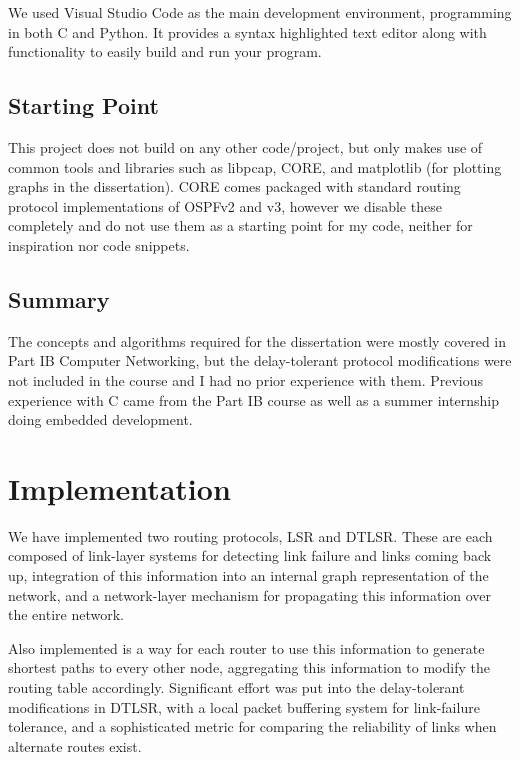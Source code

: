\documentclass[withindex,glossary,openany]{cam-thesis}
\begin{document}
We used Visual Studio Code as the main development environment, programming in both C and Python. It provides a syntax highlighted text editor along with functionality to easily build and run your program.


\section{Starting Point}

This project does not build on any other code/project, but only makes use of common tools and libraries such as libpcap, CORE, and matplotlib (for plotting graphs in the dissertation). CORE comes packaged with standard routing protocol implementations of OSPFv2 and v3, however we disable these completely and do not use them as a starting point for my code, neither for inspiration nor code snippets.

\section{Summary}

The concepts and algorithms required for the dissertation were mostly covered in Part IB Computer Networking, but the delay-tolerant protocol modifications were not included in the course and I had no prior experience with them. Previous experience with C came from the Part IB course as well as a summer internship doing embedded development.

\chapter{Implementation}

We have implemented two routing protocols, LSR and DTLSR. These are each composed of link-layer systems for detecting link failure and links coming back up, integration of this information into an internal graph representation of the network, and a network-layer mechanism for propagating this information over the entire network.

Also implemented is a way for each router to use this information to generate shortest paths to every other node, aggregating this information to modify the routing table accordingly. Significant effort was put into the delay-tolerant modifications in DTLSR, with a local packet buffering system for link-failure tolerance, and a sophisticated metric for comparing the reliability of links when alternate routes exist.
\end{document}
